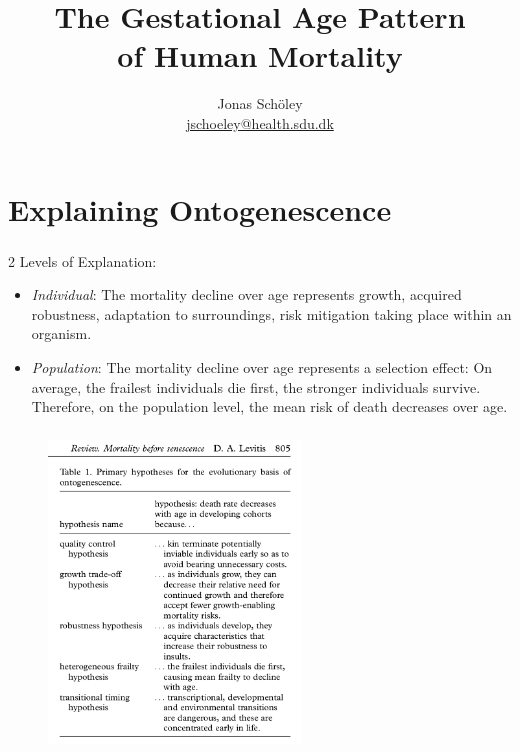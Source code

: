 \documentclass{beamer}
\title{The Gestational Age Pattern\\of Human Mortality}
\author{Jonas Schöley\\\url{jschoeley@health.sdu.dk}}
\begin{document}
{
\begin{frame}[plain]
\titlepage
\end{frame}
}

\clearpage

\section{Explaining Ontogenescence} %

\begin{frame}
\frametitle{\insertsection}

2 Levels of Explanation:

\begin{itemize}
\item \emph{Individual}: The mortality decline over age represents growth, acquired robustness, adaptation to surroundings, risk mitigation taking place within an organism.
\item \emph{Population}: The mortality decline over age represents a selection effect: On average, the frailest individuals die first, the stronger individuals survive. Therefore, on the population level, the mean risk of death decreases over age.
\end{itemize}

\end{frame}

\begin{frame}
\frametitle{\insertsection}

\begin{figure}[htb!]
\includegraphics[width = 0.6\textwidth]{./fig/danielle_hypotheses.png} \\
\cite{Levitis2011}
\end{figure}

\end{frame}
\end{document}
